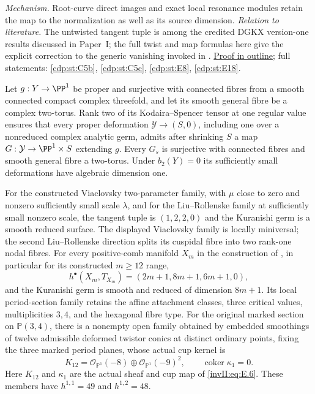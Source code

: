 \textit{Mechanism.} Root-curve direct images and exact local
resonance modules retain the map to the normalization as well as
its source dimension.
\textit{Relation to literature.} The untwisted tangent tuple is
among the credited DGKX version-one results discussed in Paper~I;
the full twist and map formulas here give the explicit correction
to the generic vanishing invoked in \cite[Theorem~2.2]{CDP2020}.
\hyperlink{outline-II-E}{Proof in outline}; full statements:
\ref{cdp:st:C5b}, \ref{cdp:st:C5c}, \ref{cdp:st:E8},
\ref{cdp:st:E18}.

\hypertarget{main-II-F}{}
\begin{maintheorem}
\hypertarget{tag-03K7}{}\label{series:II:F}

Let $g:Y\to\PP^1$ be proper and surjective with connected fibres
from a smooth connected compact complex threefold, and let its
smooth general fibre be a complex two-torus. Rank two of its
Kodaira--Spencer tensor at one regular value ensures that every
proper deformation $\mathcal Y\to(S,0)$, including one over a
nonreduced complex analytic germ, admits after shrinking $S$ a
map $G:\mathcal Y\to\PP^1\times S$ extending $g$. Every $G_s$
is surjective with connected fibres and smooth general fibre a
two-torus. Under $b_2(Y)=0$ its sufficiently small deformations
have algebraic dimension one.

For the constructed Viaclovsky two-parameter family, with
$\mu$ close to zero and nonzero sufficiently small scale
$\lambda$, and for the Liu--Rollenske family at sufficiently
small nonzero scale, the tangent tuple is $(1,2,2,0)$ and the
Kuranishi germ is a smooth reduced surface. The displayed
Viaclovsky family is locally miniversal; the second
Liu--Rollenske direction splits its cuspidal fibre into two
rank-one nodal fibres. For every positive-comb manifold $X_m$
in the construction of \cite{Viaclovsky2026Combs}, in particular
for its constructed $m\ge12$ range,
\[
 h^\bullet(X_m,T_{X_m})=(2m+1,8m+1,6m+1,0),
\]
and the Kuranishi germ is smooth and reduced of dimension $8m+1$.
Its local period-section family retains the affine attachment
classes, three critical values, multiplicities $3,4$, and the
hexagonal fibre type.
For the original marked section on $\mathbb P(3,4)$, there is a
nonempty open family obtained by embedded smoothings of twelve
admissible deformed twistor conics at distinct ordinary points,
fixing the three marked period planes, whose actual cup kernel is
\[
 K_{12}=\mathcal O_{\mathbb P^1}(-8)
       \oplus\mathcal O_{\mathbb P^1}(-9)^2,
 \qquad \operatorname{coker}\kappa_1=0.
\]
Here $K_{12}$ and $\kappa_1$ are the actual sheaf and cup map of
\eqref{invII:eq:E.6}. These members have
$h^{1,1}=49$ and $h^{1,2}=48$.


\end{maintheorem}
